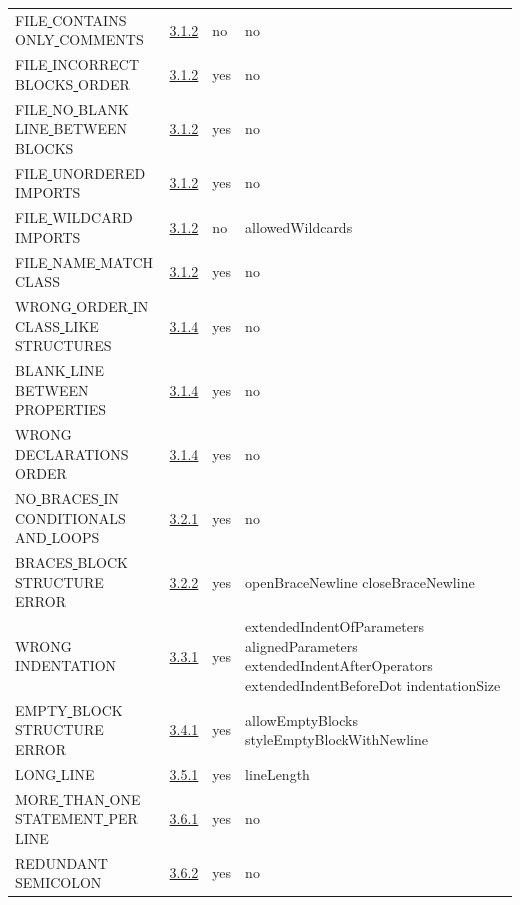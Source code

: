 \begin{longtable}{ |l|p{0.8cm}|p{0.8cm}| p{3cm} | }
FILE\underline{ }CONTAINS\underline{ }ONLY\underline{ }COMMENTS & \hyperref[sec:3.1.2]{ 3.1.2} &  no  &   no  \\
FILE\underline{ }INCORRECT\underline{ }BLOCKS\underline{ }ORDER & \hyperref[sec:3.1.2]{ 3.1.2} &  yes  &   no  \\
FILE\underline{ }NO\underline{ }BLANK\underline{ }LINE\underline{ }BETWEEN\underline{ }BLOCKS & \hyperref[sec:3.1.2]{ 3.1.2} &  yes  &   no  \\
FILE\underline{ }UNORDERED\underline{ }IMPORTS & \hyperref[sec:3.1.2]{ 3.1.2} &  yes  &   no  \\
FILE\underline{ }WILDCARD\underline{ }IMPORTS & \hyperref[sec:3.1.2]{ 3.1.2} &  no  &   allowedWildcards           \\
FILE\underline{ }NAME\underline{ }MATCH\underline{ }CLASS & \hyperref[sec:3.1.2]{ 3.1.2} &  yes  &   no  \\
WRONG\underline{ }ORDER\underline{ }IN\underline{ }CLASS\underline{ }LIKE\underline{ }STRUCTURES & \hyperref[sec:3.1.4]{ 3.1.4} &  yes  &   no  \\
BLANK\underline{ }LINE\underline{ }BETWEEN\underline{ }PROPERTIES & \hyperref[sec:3.1.4]{ 3.1.4} &  yes  &   no  \\
WRONG\underline{ }DECLARATIONS\underline{ }ORDER & \hyperref[sec:3.1.4]{ 3.1.4} &  yes  &   no  \\
NO\underline{ }BRACES\underline{ }IN\underline{ }CONDITIONALS\underline{ }AND\underline{ }LOOPS & \hyperref[sec:3.2.1]{ 3.2.1} &  yes  &   no  \\
BRACES\underline{ }BLOCK\underline{ }STRUCTURE\underline{ }ERROR & \hyperref[sec:3.2.2]{ 3.2.2} &  yes  &   openBraceNewline closeBraceNewline  \\
WRONG\underline{ }INDENTATION & \hyperref[sec:3.3.1]{ 3.3.1} &  yes  &  extendedIndentOfParameters alignedParameters extendedIndentAfterOperators extendedIndentBeforeDot indentationSize   \\
EMPTY\underline{ }BLOCK\underline{ }STRUCTURE\underline{ }ERROR & \hyperref[sec:3.4.1]{ 3.4.1} &  yes  &   allowEmptyBlocks styleEmptyBlockWithNewline  \\
LONG\underline{ }LINE & \hyperref[sec:3.5.1]{ 3.5.1} &  yes  &   lineLength                 \\
MORE\underline{ }THAN\underline{ }ONE\underline{ }STATEMENT\underline{ }PER\underline{ }LINE & \hyperref[sec:3.6.1]{ 3.6.1} &  yes  &   no  \\
REDUNDANT\underline{ }SEMICOLON & \hyperref[sec:3.6.2]{ 3.6.2} &  yes  &   no  \\

\end{longtable}
